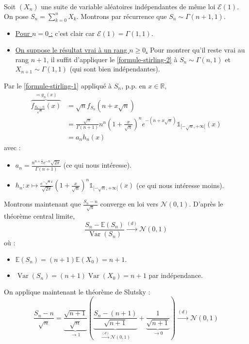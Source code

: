 	\begin{demonstration}
		Soit $(X_n)$ une suite de variable aléatoires indépendantes de même loi $\mathcal{E}(1)$. On pose $S_n = \sum_{k=0}^n X_k$. Montrons par récurrence que $S_n \sim \Gamma(n+1, 1)$.
		\begin{itemize}
			\item \underline{Pour $n = 0$ :} c'est clair car $\mathcal{E}(1) = \Gamma(1, 1)$.
			\item \underline{On suppose le résultat vrai à un rang $n \geq 0$.} Pour montrer qu'il reste vrai au rang $n+1$, il suffit d'appliquer le \cref{formule-stirling-2} à $S_n \sim \Gamma(n, 1)$ et $X_{n+1} \sim \Gamma(1, 1)$ (qui sont bien indépendantes).
		\end{itemize}
		Par le \cref{formule-stirling-1} appliqué à $S_n$, p.p. en $x \in \mathbb{R}$,
		\begin{align*}
			\overbrace{f_{\frac{S_n - n}{\sqrt{n}}}(x)}^{= g_n(x)} & = \sqrt{n} f_{S_n} (n + x \sqrt{n}) \\
			& = \frac{\sqrt{n}}{\Gamma(n+1)} n^n \left(1 + \frac{x}{\sqrt{n}} \right)^n e^{-(n + x\sqrt{n})} \mathbb{1}_{[-\sqrt{n}, +\infty[}(x) \\
			& = a_n h_n(x)
		\end{align*}
		avec :
		\begin{itemize}
			\item $a_n = \frac{n^{n+\frac{1}{2}} e^{-n} \sqrt{2 \pi}}{\Gamma(n+1)}$ (ce qui nous intéresse).
			\item $h_n : x \mapsto \frac{e^{-\sqrt{n} x}}{\sqrt{2\pi}} \left( 1 + \frac{x}{\sqrt{n}} \right)^n \mathbb{1}_{[-\sqrt{n}, +\infty[}(x)$ (ce qui nous intéresse moins).
		\end{itemize}
		\medskip
		Montrons maintenant que $\frac{S_n - n}{\sqrt{n}}$ converge en loi vers $\mathcal{N}(0,1)$. D'après le théorème central limite,
		\[ \frac{S_n - \mathbb{E}(S_n)}{\operatorname{Var}(S_n)} \overset{(d)}{\longrightarrow} \mathcal{N}(0,1) \]
		où :
		\begin{itemize}
			\item $\mathbb{E}(S_n) = (n+1) \mathbb{E}(X_0) = n+1$.
			\item $\operatorname{Var}(S_n) = (n+1) \operatorname{Var}(X_0) = n+1$ par indépendance.
		\end{itemize}
		On applique maintenant le théorème de Slutsky :
		\[ \frac{S_n - n}{\sqrt{n}} = \underbrace{\frac{\sqrt{n+1}}{\sqrt{n}}}_{\longrightarrow 1} \left( \underbrace{\frac{S_n - (n+1)}{\sqrt{n+1}}}_{\overset{(d)}{\longrightarrow} \mathcal{N}(0,1)} + \underbrace{\frac{1}{\sqrt{n+1}}}_{\longrightarrow 0} \right) \overset{(d)}{\longrightarrow} \mathcal{N}(0,1) \]

\end{demonstration}
